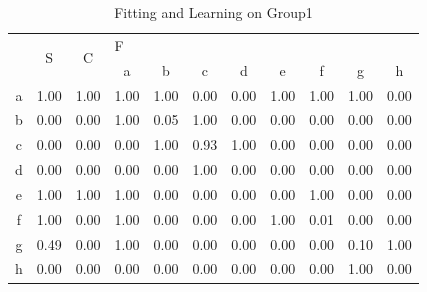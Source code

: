 \begin{table}[]
\centering
\begin{tabular}{c|c|c|cccccccc}
\toprule
\multirow{2}{*}{} & \multirow{2}{*}{S} & \multirow{2}{*}{C} & \multicolumn{8}{l}{F}                                 \\ \cmidrule{4-11}
                  &                    &                    & a    & b    & c    & d    & e    & f    & g    & h    \\ \midrule
a                 & 1.00               & 1.00               & 1.00 & 1.00 & 0.00 & 0.00 & 1.00 & 1.00 & 1.00 & 0.00 \\
b                 & 0.00               & 0.00               & 1.00 & 0.05 & 1.00 & 0.00 & 0.00 & 0.00 & 0.00 & 0.00 \\
c                 & 0.00               & 0.00               & 0.00 & 1.00 & 0.93 & 1.00 & 0.00 & 0.00 & 0.00 & 0.00 \\
d                 & 0.00               & 0.00               & 0.00 & 0.00 & 1.00 & 0.00 & 0.00 & 0.00 & 0.00 & 0.00 \\
e                 & 1.00               & 1.00               & 1.00 & 0.00 & 0.00 & 0.00 & 0.00 & 1.00 & 0.00 & 0.00 \\
f                 & 1.00               & 0.00               & 1.00 & 0.00 & 0.00 & 0.00 & 1.00 & 0.01 & 0.00 & 0.00 \\
g                 & 0.49               & 0.00               & 1.00 & 0.00 & 0.00 & 0.00 & 0.00 & 0.00 & 0.10 & 1.00 \\
h                 & 0.00               & 0.00               & 0.00 & 0.00 & 0.00 & 0.00 & 0.00 & 0.00 & 1.00 & 0.00 \\ \bottomrule
\end{tabular}
\caption{Fitting and Learning on Group1}
\label{table:learning-group-1}
\end{table}

